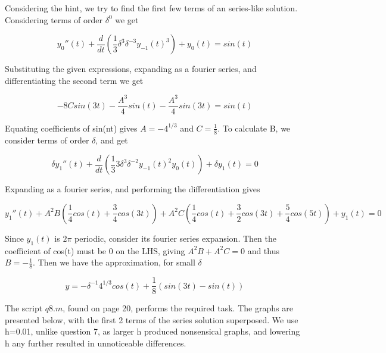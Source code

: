\documentclass[10pt,a4paper]{report}
\begin{document}
Considering the hint, we try to find the first few terms of an series-like 	solution. Considering terms of order $\delta^0$ we get

\begin{equation*}
y_0''(t)+\frac{d}{dt}(\frac{1}{3}\delta^3\delta^{-3}y_{-1}(t)^3)+y_0(t)=sin(t)
\end{equation*}

Substituting the given expressions, expanding as a fourier series, and differentiating the second term we get

\begin{equation*}
-8Csin(3t)-\frac{A^3}{4}sin(t)-\frac{A^3}{4}sin(3t)=sin(t)
\end{equation*}

Equating coefficients of sin(nt) gives $A=-4^{1/3}$ and $C=\frac{1}{8}$. To calculate B, we consider terms of order $\delta$, and get

\begin{equation*}
\delta y_1''(t)+\frac{d}{dt}(\frac{1}{3}3\delta^3\delta^{-2}y_{-1}(t)^2y_0(t))+\delta y_1(t)=0
\end{equation*}

Expanding as a fourier series, and performing the differentiation gives

\begin{equation*}
y_1''(t)+A^2B(\frac{1}{4}cos(t)+\frac{3}{4}cos(3t))+A^2C(\frac{1}{4}cos(t)+\frac{3}{2}cos(3t)+\frac{5}{4}cos(5t)) +y_1(t)=0
\end{equation*}

Since $y_1(t)$ is $2\pi$ periodic, consider its fourier series expansion. Then the coefficient of cos(t) must be 0 on the LHS, giving $A^2B+A^2C=0$ and thus $B=-\frac{1}{8}$. Then we have the approximation, for small $\delta$ 

\begin{equation*}
y=-\delta^{-1}4^{1/3}cos(t)+\frac{1}{8}(sin(3t)-sin(t))
\end{equation*}
	

The script $q8.m$, found on page 20, performs the required task. The graphs are presented below, with the first 2 terms of the series solution superposed. We use h=0.01, unlike question 7, as larger h produced nonsensical graphs, and lowering h any further resulted in unnoticeable differences.
\end{document}
